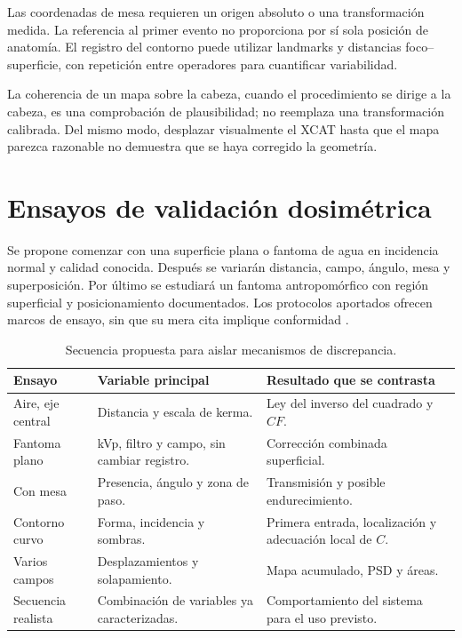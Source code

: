 Las coordenadas de mesa requieren un origen absoluto o una transformación medida. La referencia al primer evento no proporciona por sí sola posición de anatomía. El registro del contorno puede utilizar landmarks y distancias foco--superficie, con repetición entre operadores para cuantificar variabilidad.

La coherencia de un mapa sobre la cabeza, cuando el procedimiento se dirige a la cabeza, es una comprobación de plausibilidad; no reemplaza una transformación calibrada. Del mismo modo, desplazar visualmente el XCAT hasta que el mapa parezca razonable no demuestra que se haya corregido la geometría.

\section{Ensayos de validación dosimétrica}
Se propone comenzar con una superficie plana o fantoma de agua en incidencia normal y calidad conocida. Después se variarán distancia, campo, ángulo, mesa y superposición. Por último se estudiará un fantoma antropomórfico con región superficial y posicionamiento documentados. Los protocolos aportados ofrecen marcos de ensayo, sin que su mera cita implique conformidad \citep{veridic2020,ganan2024}.

\begin{table}[htbp]\centering\small
\caption{Secuencia propuesta para aislar mecanismos de discrepancia.}
\begin{tabularx}{\textwidth}{p{30mm}YY}\toprule
Ensayo & Variable principal & Resultado que se contrasta\\\midrule
Aire, eje central & Distancia y escala de kerma. & Ley del inverso del cuadrado y $CF$.\\
Fantoma plano & kVp, filtro y campo, sin cambiar registro. & Corrección combinada superficial.\\
Con mesa & Presencia, ángulo y zona de paso. & Transmisión y posible endurecimiento.\\
Contorno curvo & Forma, incidencia y sombras. & Primera entrada, localización y adecuación local de $C$.\\
Varios campos & Desplazamientos y solapamiento. & Mapa acumulado, PSD y áreas.\\
Secuencia realista & Combinación de variables ya caracterizadas. & Comportamiento del sistema para el uso previsto.\\\bottomrule
\end{tabularx}
\end{table}


